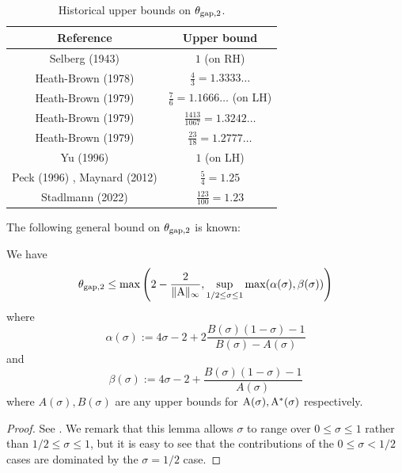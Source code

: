     \begin{table}[ht]
        \caption{Historical upper bounds on $\theta_{\mathrm{gap},2}$.}
        \label{gapsquare-table}
        \centering
        \renewcommand{\arraystretch}{1.2}
        \begin{tabular}{|c|c|}
        \hline
        Reference & Upper bound \\
        \hline
        Selberg (1943) \cite{selberg_1943} & $1$ (on RH)\\
        \hline
        Heath-Brown (1978) \cite{heath_brown_consecutive_I} & $\frac{4}{3} = 1.3333\dots$\\
        \hline
        Heath-Brown (1979) \cite{heath_brown_consecutive_II} & $\frac{7}{6} = 1.1666\dots$ (on LH) \\
        \hline
        Heath-Brown (1979) \cite{heath_brown_consecutive_II} & $\frac{1413}{1067} = 1.3242\dots$ \\
        \hline
        Heath-Brown (1979) \cite{heath_brown_consecutive_III} & $\frac{23}{18} = 1.2777\dots$ \\
        \hline
        Yu (1996) \cite{yu_differences_1996} & $1$ (on LH) \\
        \hline
        Peck (1996) \cite{peck_on_1996}, Maynard (2012) \cite{maynard_difference_2012} & $\frac{5}{4} = 1.25$ \\
        \hline
        Stadlmann (2022) \cite{stadlmann_mean_2022} & $\frac{123}{100} = 1.23$ \\
        \hline
    \end{tabular}
    \end{table}

The following general bound on $\theta_{\mathrm{gap},2}$ is known:

\begin{proposition}\label{gapsquare-from-a}
    We have
    $$ \theta_{\mathrm{gap},2} \leq \max\left( 2-\frac{2}{\|\mathrm{A}\|_\infty}, \sup_{1/2 \leq \sigma \leq 1} \max(\alpha(\sigma), \beta(\sigma))\right)$$
    where
    $$ \alpha(\sigma) := 4\sigma - 2 + 2 \frac{B(\sigma)(1-\sigma)-1}{B(\sigma)-A(\sigma)}$$
    and
    $$ \beta(\sigma) := 4\sigma - 2 + \frac{B(\sigma)(1-\sigma)-1}{A(\sigma)}$$
    where $A(\sigma), B(\sigma)$ are any upper bounds for $\mathrm{A}(\sigma), \mathrm{A}^*(\sigma)$ respectively.
\end{proposition}

\begin{proof} See \cite[Lemma 2]{heath_brown_consecutive_II}. We remark that this lemma allows $\sigma$ to range over $0 \leq \sigma \leq 1$ rather than $1/2 \leq \sigma \leq 1$, but it is easy to see that the contributions of the $0 \leq \sigma < 1/2$ cases are dominated by the $\sigma=1/2$ case.
\end{proof}

